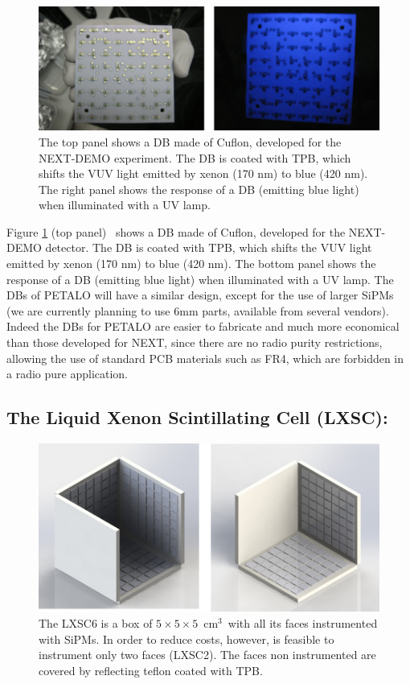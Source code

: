 \documentclass[a4paper,11pt,oneside]{article}
\begin{document}
\begin{figure}[!htb]
	\centering
	\includegraphics[scale=0.5]{img/DC.png}
	\caption{\label{fig.DB} The top panel shows a DB made of Cuflon, developed for the NEXT-DEMO experiment. The DB is coated with TPB, which shifts the VUV light emitted by xenon (170 nm) to blue (420 nm). The right panel shows the response of a DB (emitting blue light) when illuminated with a UV lamp.  }
\end{figure}

Figure \ref{fig.DB} (top panel) ~shows a DB made of Cuflon, developed for the NEXT-DEMO detector. The DB is coated with TPB, which shifts the VUV light emitted by xenon (170 nm) to blue (420 nm). The bottom panel shows the response of a DB (emitting blue light) when illuminated with a UV lamp. The DBs of PETALO will have a similar design, except for the use of larger SiPMs (we are currently planning to use 6mm parts, available from several vendors).
Indeed the DBs for PETALO are easier to fabricate and much more economical than those developed for NEXT, since there are no radio purity restrictions, allowing the use of standard PCB materials such as FR4, which are forbidden in a radio pure application.

\subsection{The Liquid Xenon Scintillating Cell (LXSC):}

\label{sec.lxsc}

\begin{figure}[!htb]
	\centering
	\includegraphics[scale=0.5]{img/lxsc.png}
	\caption{\label{fig.box} The LXSC6 is a box of 
	$5\times 5 \times 5$~cm$^3$~with all its faces instrumented with SiPMs. In order to reduce costs, however, is feasible to instrument only two faces (LXSC2). The faces non instrumented are covered by reflecting teflon coated with TPB. }
\end{figure}
\end{document}
